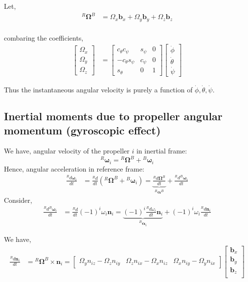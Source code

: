 Let,
\begin{align*}
    {}^R\pmb \Omega^B  &= \Omega_x \pmb b_x + \Omega_y \pmb b_y + \Omega_z \pmb b_z\\
\end{align*}

combaring the coefficients,
\begin{align*}
    \begin{bmatrix}
        \Omega_x \\ \Omega_y \\ \Omega_z
    \end{bmatrix}
    &=
    \begin{bmatrix}
        c_{\theta}c_{\psi} &  s_{\psi} & 0\\
        -c_{\theta}s_{\psi} & c_{\psi} & 0\\
        s_{\theta} & 0 & 1
    \end{bmatrix}
    \begin{bmatrix}
        \dot \phi \\ \dot \theta \\ \dot \psi
    \end{bmatrix}
\end{align*}

Thus the instantaneous angular velocity is purely a function of $\dot \phi , \dot \theta , \dot \psi $.


\subsection{Inertial moments due to propeller angular momentum (gyroscopic effect)}
We have, angular velocity of the propeller $i$ in inertial frame:
$${}^R \pmb \omega_i = {}^R \pmb \Omega^B + {}^B \pmb \omega_i$$
Hence, angular acceleration in reference frame:
\begin{align*}
    \frac{{}^R d \pmb \omega_i}{dt} &= \frac{{}^R d}{dt}\left( {}^R \pmb \Omega^B + {}^B \pmb \omega_i \right)
    = \underbrace{\frac{{}^R d \pmb \Omega^B}{dt}}_{{}^R\pmb\alpha^B} + \frac{{}^R d{}^B \pmb \omega_i}{dt}
\end{align*}
Consider,
\begin{align*}
    \frac{{}^R d{}^B \pmb \omega_i}{dt} &= \frac{{}^R d}{dt} (-1)^{i} \omega_i \pmb n_i
    = \underbrace{(-1)^{i} \frac{{}^R d\omega_i }{dt} \pmb n_i}_{{}^B \pmb \alpha_i} +
    (-1)^{i} \omega_i \frac{{}^R d\pmb n_i}{dt}
\end{align*}

We have,
\begin{align*}
    \frac{{}^R d\pmb n_i}{dt} &= {}^R \pmb \Omega^B \times \pmb n_i
    = \begin{bmatrix}
        \Omega_y n_{iz} - \Omega_z n_{iy} &
        \Omega_z n_{ix} - \Omega_x n_{iz} &
        \Omega_x n_{iy} - \Omega_y n_{ix}
    \end{bmatrix}
    \begin{bmatrix}
    \pmb b_x \\ \pmb b_y \\ \pmb b_z\\
    \end{bmatrix}
\end{align*}

